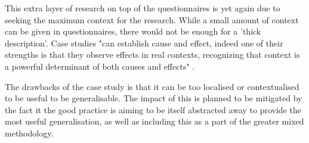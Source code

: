 This extra layer of research on top of the questionnaires is yet again due to seeking the maximum context for the research. While a small amount of context can be given in questionnaires, there would not be enough for a 'thick description'. Case studies "can establish cause and effect, indeed one of their strengths is that they observe effects in real contexts, recognizing that context is a powerful determinant of both causes and effects" \cite[p. 181]{Cohen2005}.

The drawbacks of the case study is that it can be too localised or contextualised to be useful to be generalisable. The impact of this is planned to be mitigated by the fact it the good practice is aiming to be itself abstracted away to provide the most useful generalisation, as well as including this as a part of the greater mixed methodology.
